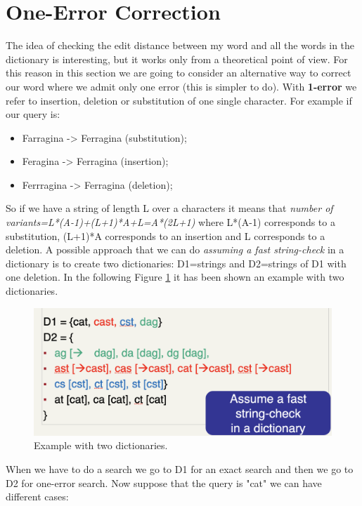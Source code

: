 \section{One-Error Correction}
The idea of checking the edit distance between my word and all the words in the dictionary is interesting, but it works only from a theoretical point of view. For this reason in this section we are going to consider an alternative way to correct our word where we admit only one error (this is simpler to do).\newline
With \textbf{1-error} we refer to insertion, deletion or substitution of one single character. For example if our query is:
\begin{itemize}
    \item Farragina -> Ferragina (substitution);
    \item Feragina -> Ferragina (insertion);
    \item Ferrragina -> Ferragina (deletion);
\end{itemize}
So if we have a string of length L over a characters it means that \textit{number of variants=L*(A-1)+(L+1)*A+L=A*(2L+1)} where L*(A-1) corresponds to a substitution, (L+1)*A corresponds to an insertion and L corresponds to a deletion.\newline
A possible approach that we can do \textit{assuming a fast string-check} in a dictionary is to create two dictionaries: D1={strings} and D2={strings of D1 with one deletion}. In the following Figure \ref{fig:exampletwodictionaries} it has been shown an example with two dictionaries.\newline
\begin{figure}
    \centering
    \includegraphics[width=0.75\linewidth]{images/exampletwodictionaries.png}
    \caption{Example with two dictionaries.}
    \label{fig:exampletwodictionaries}
\end{figure}
When we have to do a search we go to D1 for an exact search and then we go to D2 for one-error search.\newline
Now suppose that the query is "cat" we can have different cases:
